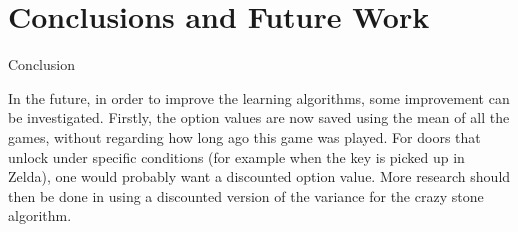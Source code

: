 \section{Conclusions and Future Work}
\label{sec:conclusion}
Conclusion

In the future, in order to improve the learning algorithms, some improvement can
be investigated. Firstly, the option values are now saved using the mean of all
the games, without regarding how long ago this game was played. For doors that
unlock under specific conditions (for example when the key is picked up in
Zelda), one would probably want a discounted option value. More research should
then be done in using a discounted version of the variance for the crazy stone
algorithm.
